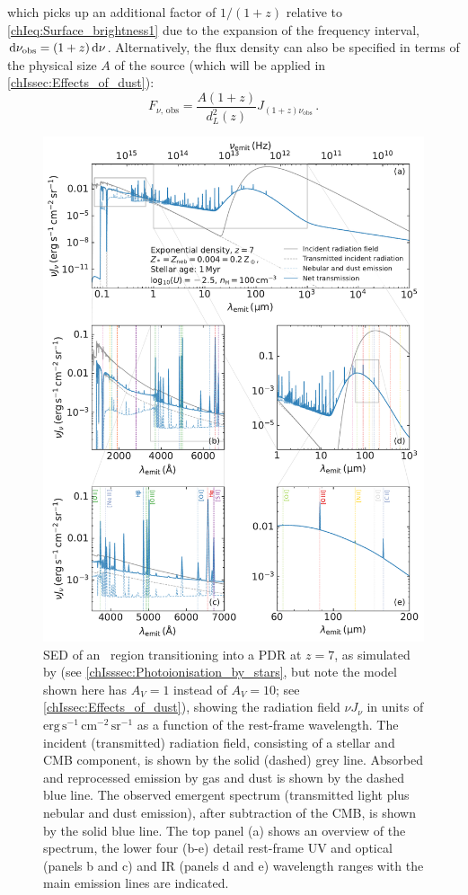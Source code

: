 \noindent which picks up an additional factor of $1/(1+z)$ relative to \cref{chIeq:Surface_brightness1} due to the expansion of the frequency interval, $\dif \nu_\text{obs} = (1+z) \dif \nu$. Alternatively, the flux density can also be specified in terms of the physical size $A$ of the source (which will be applied in \cref{chIssec:Effects_of_dust}):
\begin{equation}
    \label{chIeq:Flux_density2}
    F_{\nu, \, \text{obs}} = \frac{A \left( 1 + z \right)}{d_L^2(z)} J_{(1 + z) \nu_\text{obs}} \, .
\end{equation}
\begin{figure}
    \centering
    \includegraphics[width=0.9\linewidth]{"Figs/Cloudy_spectra"}
    \caption[SED of an \HII\ region transitioning into a PDR]
    {SED of an \HII\ region transitioning into a PDR at $z = 7$, as simulated by  (see \cref{chIsssec:Photoionisation_by_stars}, but note the model shown here has $A_V = 1$ instead of $A_V = 10$; see \cref{chIssec:Effects_of_dust}), showing the radiation field $\nu J_\nu$ in units of $\mathrm{erg \, s^{-1} \, cm^{-2} \, sr^{-1}}$ as a function of the rest-frame wavelength. The incident (transmitted) radiation field, consisting of a stellar and CMB component, is shown by the solid (dashed) grey line. Absorbed and reprocessed emission by gas and dust is shown by the dashed blue line. The observed emergent spectrum (transmitted light plus nebular and dust emission), after subtraction of the CMB, is shown by the solid blue line. The top panel (a) shows an overview of the spectrum, the lower four (b-e) detail rest-frame UV and optical (panels b and c) and IR (panels d and e) wavelength ranges with the main emission lines are indicated.}
    \label{chIfig:Cloudy_spectra}
\end{figure}

